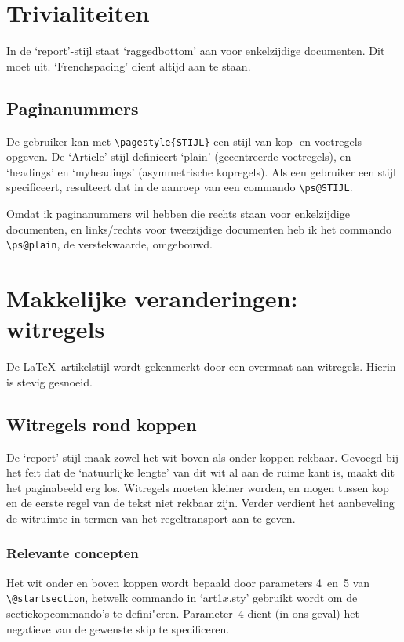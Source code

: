 \documentclass[oldtoc,a4paper,10pt]{rapport3}
\begin{document}
\section{Trivialiteiten}
 
In de `report'-stijl staat `raggedbottom' aan voor enkelzijdige
documenten. Dit moet uit. `Frenchspacing' dient altijd aan te staan.
 
\subsection{Paginanummers}
De gebruiker kan met \verb.\pagestyle{STIJL}. een stijl van kop- en
voetregels opgeven. De `Article' stijl definieert `plain'
(gecentreerde voetregels), en `headings' en `myheadings'
(asymmetrische kopregels).  Als een gebruiker een stijl specificeert,
resulteert dat in de aanroep van een commando \verb.\ps@STIJL..
 
Omdat ik paginanummers wil hebben die rechts staan voor enkelzijdige
documenten, en links/rechts voor tweezijdige documenten heb ik het
commando \verb.\ps@plain., de verstekwaarde, omgebouwd.
 
 
\section{Makkelijke veranderingen: witregels}
 
De \LaTeX\ artikelstijl wordt gekenmerkt door een overmaat aan
witregels. Hierin is stevig gesnoeid.
 
\subsection{Witregels rond koppen}
 
De `report'-stijl maak zowel het wit boven als onder koppen rekbaar.
Gevoegd bij het feit dat de `natuurlijke lengte' van dit wit al aan de
ruime kant is, maakt dit het paginabeeld erg los. Witregels moeten
kleiner worden, en mogen tussen kop en de eerste regel van de tekst
niet rekbaar zijn.  Verder verdient het aanbeveling de witruimte in
termen van het regeltransport aan te geven.
 
\subsubsection{Relevante concepten}
Het wit onder en boven koppen wordt bepaald door parameters 4~en~5 van
\verb.\@start.\-\verb.section., hetwelk commando in `art1$x$.sty'
gebruikt wordt om de sectiekopcommando's te defini"eren. Parameter~4
dient (in ons geval) het negatieve van de gewenste skip te
specificeren.
 
\end{document}
